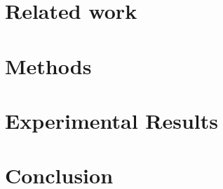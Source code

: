 \documentclass{article}
\begin{document}
\begin{multicols}{2}
\section{Related work}

\section{Methods}

\section{Experimental Results}

\section{Conclusion}


    
\end{multicols}
\end{document}
